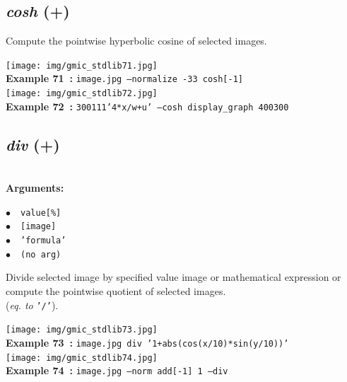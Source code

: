 \documentclass[a4paper,10.5pt,twoside]{book}
\def\comma{\discretionary{,}{}{,}}
\newcommand{\Cb}[1]{\textcolor{cb}{#1}}
\begin{document}
\subsection{\emph{cosh} (+)}\vspace*{-0.7em}
Compute the pointwise hyperbolic cosine of selected images.
\begin{center}\texttt{[image: img/gmic\_stdlib71.jpg]}\\
{\footnotesize \textbf{Example 71~:} \texttt{image.jpg --normalize -3{\comma}3 cosh[-1]}}
\\\texttt{[image: img/gmic\_stdlib72.jpg]}\\
{\footnotesize \textbf{Example 72~:} \texttt{300{\comma}1{\comma}1{\comma}1{\comma}'4*x/w+u' --cosh display\_graph 400{\comma}300}}
\end{center}

\subsection{\emph{div} (+)}\vspace*{-0.7em}
~\\\textbf{\Cb{Arguments: }}\begin{flushleft}
{\small \Cb{\hspace*{0.5cm}$\bullet$~~\texttt{value[\%]}}}~~~\\
{\small \Cb{\hspace*{0.5cm}$\bullet$~~\texttt{[image]}}}~~~\\
{\small \Cb{\hspace*{0.5cm}$\bullet$~~\texttt{'formula'}}}~~~\\
{\small \Cb{\hspace*{0.5cm}$\bullet$~~\texttt{(no arg)}}}\end{flushleft}
Divide selected image by specified value{\comma} image or mathematical expression{\comma}
or compute the pointwise quotient of selected images.
~\\(\emph{eq. to} {\small \texttt{'/'}}).
\begin{center}\texttt{[image: img/gmic\_stdlib73.jpg]}\\
{\footnotesize \textbf{Example 73~:} \texttt{image.jpg div '1+abs(cos(x/10)*sin(y/10))'}}
\\\texttt{[image: img/gmic\_stdlib74.jpg]}\\
{\footnotesize \textbf{Example 74~:} \texttt{image.jpg --norm add[-1] 1 --div}}
\end{center}
\end{document}
